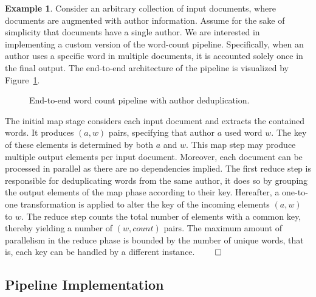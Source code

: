 \documentclass[11pt]{article}
\theoremstyle{definition}
\newtheorem{exmp}{Example}[section]
\begin{document}
\begin{exmp}\label{ex:pipeline} Consider an arbitrary collection of input documents, where documents are augmented with author information. Assume for the sake of simplicity that documents have a single author. We are interested in implementing a custom version of the word-count pipeline. Specifically, when an author uses a specific word in multiple documents, it is accounted solely once in the final output. The end-to-end architecture of the pipeline is visualized by Figure~\ref{fig:example}.

\begin{figure}[]
\centering
	\caption{End-to-end word count pipeline with author deduplication.}
	\label{fig:example}
\end{figure}

The initial map stage considers each input document and extracts the contained words. It produces $(a, w)$ pairs, specifying that author $a$ used word $w$. The key of these elements is determined by both $a$ and $w$. This map step may produce multiple output elements per input document. Moreover, each document can be processed in parallel as there are no dependencies implied. The first reduce step is responsible for deduplicating words from the same author, it does so by grouping the output elements of the map phase according to their key. Hereafter, a one-to-one transformation is applied to alter the key of the incoming elements $(a, w)$ to $w$. The reduce step counts the total number of elements with a common key, thereby yielding a number of $(w, {count})$ pairs. The maximum amount of parallelism in the reduce phase is bounded by the number of unique words, that is, each key can be handled by a different instance. \hfill $\qed$
\end{exmp}

\subsection{Pipeline Implementation}
\end{document}
